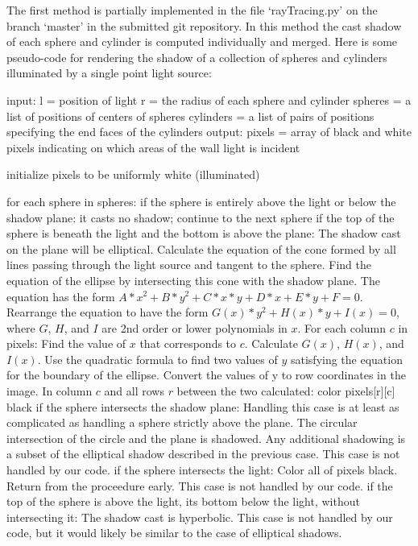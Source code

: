 \documentclass[10pt]{article}
\begin{document}
The first method is partially implemented in the file `rayTracing.py' on the branch `master' in the submitted git repository. In this method the cast shadow of each sphere and cylinder is computed individually and merged. Here is some pseudo-code for rendering the shadow of a collection of spheres and cylinders illuminated by a single point light source:

input: l = position of light
	   r = the radius of each sphere and cylinder
	   spheres = a list of positions of centers of spheres
	   cylinders = a list of pairs of positions specifying the end faces of the
					cylinders
output: pixels = array of black and white pixels indicating on which areas of the
					wall light is incident

initialize pixels to be uniformly white (illuminated)

for each sphere in spheres:
	if the sphere is entirely above the light or below the shadow plane:
		it casts no shadow; continue to the next sphere
	if the top of the sphere is beneath the light and the bottom is above the plane:
		The shadow cast on the plane will be elliptical.
		Calculate the equation of the cone formed by all lines passing through the
				light source and tangent to the sphere.
		Find the equation of the ellipse by intersecting this cone with the shadow
				plane.
		The equation has the form $A*x^2 + B*y^2 + C*x*y + D*x + E*y + F = 0$.
		Rearrange the equation to have the form $G(x)*y^2 + H(x)*y + I(x) = 0$, where
				$G$, $H$, and $I$ are 2nd order or lower polynomials in $x$.
		For each column $c$ in pixels:
			Find the value of $x$ that corresponds to $c$.
			Calculate $G(x)$, $H(x)$, and $I(x)$.
			Use the quadratic formula to find two values of $y$ satisfying the
					equation for the boundary of the ellipse.
			Convert the values of y to row coordinates in the image.
			In column $c$ and all rows $r$ between the two calculated:
				color pixels[r][c] black
	if the sphere intersects the shadow plane:
		Handling this case is at least as complicated as handling a sphere strictly
				above the plane.
		The circular intersection of the circle and the plane is shadowed.
		Any additional shadowing is a subset of the elliptical shadow described in
				the previous case.
		This case is not handled by our code.
	if the sphere intersects the light:
		Color all of pixels black.
		Return from the proceedure early.
		This case is not handled by our code.
	if the top of the sphere is above the light, its bottom below the light, without
			intersecting it:
		The shadow cast is hyperbolic.
		This case is not handled by our code, but it would likely be similar to
				the case of elliptical shadows.
\end{document}
